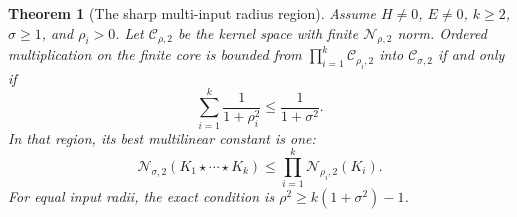 \documentclass[10pt,a4paper]{amsart}
\newtheorem{theorem}{Theorem}
\begin{document}
\begin{theorem}[The sharp multi-input radius region]\label{thm:arity}
Assume $H\ne0$, $E\ne0$, $k\ge2$, $\sigma\ge1$, and $\rho_i>0$. Let $\mathcal C_{\rho,2}$ be the kernel space with finite $\mathcal N_{\rho,2}$ norm. Ordered multiplication on the finite core is bounded from $\prod_{i=1}^k\mathcal C_{\rho_i,2}$ into $\mathcal C_{\sigma,2}$ if and only if
\begin{equation}\label{eq:arityregion}
 \sum_{i=1}^k\frac1{1+\rho_i^2}\le\frac1{1+\sigma^2}.
\end{equation}
In that region, its best multilinear constant is one:
\begin{equation}\label{eq:aritybound}
 \mathcal N_{\sigma,2}(K_1\star\cdots\star K_k)
 \le\prod_{i=1}^k\mathcal N_{\rho_i,2}(K_i).
\end{equation}
For equal input radii, the exact condition is $\rho^2\ge k(1+\sigma^2)-1$.
\end{theorem}
\end{document}
